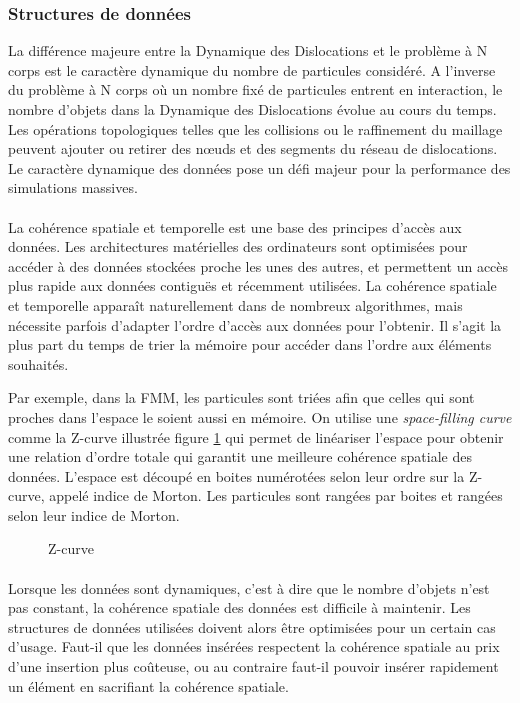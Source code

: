 \documentclass[11pt,class=article,float=false,crop=false]{standalone}
\begin{document}
\subsubsection{Structures de données}

La différence majeure entre la Dynamique des Dislocations et le problème à N corps est le caractère dynamique du nombre de particules considéré. A l'inverse du problème à N corps où un nombre fixé de particules entrent en interaction, le nombre d'objets dans la Dynamique des Dislocations évolue au cours du temps. Les opérations topologiques telles que les collisions ou le raffinement du maillage peuvent ajouter ou retirer des nœuds et des segments du réseau de dislocations. Le caractère dynamique des données pose un défi majeur pour la performance des simulations massives.

\paragraph{}
La cohérence spatiale et temporelle est une base des principes d'accès aux données. Les architectures matérielles des ordinateurs sont optimisées pour accéder à des données stockées proche les unes des autres, et permettent un accès plus rapide aux données contiguës et récemment utilisées. La cohérence spatiale et temporelle apparaît naturellement dans de nombreux algorithmes, mais nécessite parfois d'adapter l'ordre d'accès aux données pour l'obtenir. Il s'agit la plus part du temps de trier la mémoire pour accéder dans l'ordre aux éléments souhaités.

Par exemple, dans la FMM, les particules sont triées afin que celles qui sont proches dans l'espace le soient aussi en mémoire. On utilise une \textit{space-filling curve} comme la Z-curve illustrée figure \ref{fig:z-curve} qui permet de linéariser l'espace pour obtenir une relation d'ordre totale qui garantit une meilleure cohérence spatiale des données. L'espace est découpé en boites numérotées selon leur ordre sur la Z-curve, appelé indice de Morton. Les particules sont rangées par boites et rangées selon leur indice de Morton. 

\begin{figure}[H]
	\caption{Z-curve}
	\label{fig:z-curve}
\end{figure}

\paragraph{}
Lorsque les données sont dynamiques, c'est à dire que le nombre d'objets n'est pas constant, la cohérence spatiale des données est difficile à maintenir. Les structures de données utilisées doivent alors être optimisées pour un certain cas d'usage. Faut-il que les données insérées respectent la cohérence spatiale au prix d'une insertion plus coûteuse, ou au contraire faut-il pouvoir insérer rapidement un élément en sacrifiant la cohérence spatiale.
\end{document}
